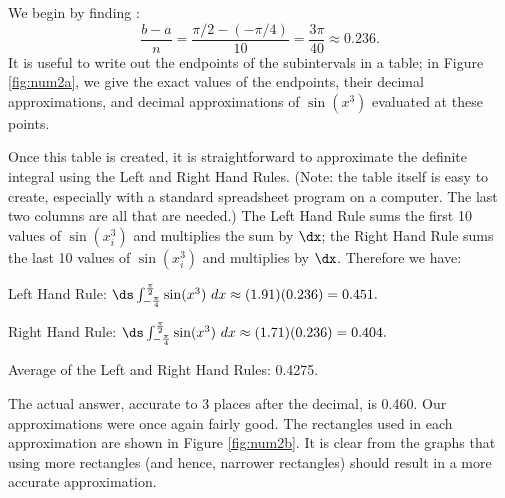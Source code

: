 {We begin by finding \dx:
$$\frac{b-a}{n} = \frac{\pi/2 - (-\pi/4)}{10} = \frac{3\pi}{40}\approx 0.236.$$
It is useful to write out the endpoints of the subintervals in a table; in Figure \ref{fig:num2a}, we give the exact values of the endpoints, their decimal approximations, and decimal approximations of $\sin(x^3)$ evaluated at these points. 

Once this table is created, it is straightforward to approximate the definite integral using the Left and Right Hand Rules. (Note: the table itself is easy to create, especially with a standard spreadsheet program on a computer. The last two columns are all that are needed.) The Left Hand Rule sums the first 10 values of $\sin(x_i^3)$ and multiplies the sum by $\dx$; the Right Hand Rule sums the last 10 values of $\sin(x_i^3)$ and multiplies by $\dx$. Therefore we have:

Left Hand Rule: $\ds \int_{-\frac{\pi}4}^{\frac{\pi}2}\sin(x^3)\ dx \approx (1.91)(0.236) = 0.451.$

Right Hand Rule: $\ds \int_{-\frac{\pi}4}^{\frac{\pi}2}\sin(x^3)\ dx \approx (1.71)(0.236) = 0.404.$

Average of the Left and Right Hand Rules: 0.4275.



The actual answer, accurate to 3 places after the decimal, is 0.460. Our approximations were once again fairly good. The rectangles used in each approximation are shown in Figure \ref{fig:num2b}. It is clear from the graphs that using more rectangles (and hence, narrower rectangles) should result in a more accurate approximation.
}\\

